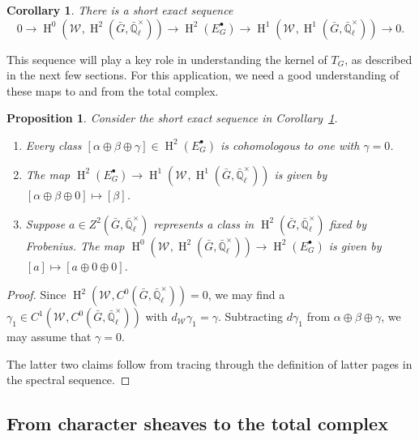 \documentclass[10pt]{amsart}
\theoremstyle{plain}
\newtheorem{proposition}[theorem]{Proposition}
\newtheorem{corollary}[theorem]{Corollary}
\theoremstyle{definition}
\newcommand{\EE}{\mathbb{\bar Q}_\ell}
\newcommand{\EEx}{\EE^\times}
\newcommand{\Weil}[1]{\mathcal{W}_{#1}}
\DeclareMathOperator{\Hh}{H}
\newcommand{\TrFrob}[1]{T_{#1}}
\newcommand{\bG}{\bar{G}}
\begin{document}
\begin{corollary}\label{cor:spectral_ses}
There is a short exact sequence
 \[
    0 \to
    \Hh^0(\Weil{},\Hh^2(\bG,\EEx)) \to
    \Hh^2(E^\bullet_G) \to
    \Hh^1(\Weil{},\Hh^1(\bG,\EEx)) \to
    0.
 \]
\end{corollary}

This sequence will play a key role in understanding the kernel of $\TrFrob{G}$, as described in the next few sections.
For this application, we need a good understanding of these maps to and from the total complex.

\begin{proposition} \label{prop:ses_desc}
Consider the short exact sequence in Corollary~\ref{cor:spectral_ses}.
\begin{enumerate}
\item Every class $[\alpha\oplus\beta\oplus\gamma] \in \Hh^2(E^\bullet_G)$ is cohomologous to one with $\gamma=0$.
\item The map $\Hh^2(E^\bullet_G) \to \Hh^1(\Weil{},\Hh^1(\bG,\EEx))$ is given by $[\alpha\oplus\beta\oplus 0] \mapsto [\beta]$.
\item Suppose $a \in Z^2(\bG, \EEx)$ represents a class in $\Hh^2(\bG,\EEx)$ fixed by Frobenius.
The map $\Hh^0(\Weil{},\Hh^2(\bG,\EEx)) \to \Hh^2(E^\bullet_G)$ is given by $[a] \mapsto [a \oplus 0 \oplus 0]$.
\end{enumerate}
\end{proposition}
\begin{proof}
Since $\Hh^2(\Weil{}, C^0(\bG, \EEx)) = 0$, we may find a $\gamma_1 \in C^1(\Weil{}, C^0(\bG, \EEx))$ with $d_{\Weil{}}\gamma_1 = \gamma$.
Subtracting $d \gamma_1$ from $\alpha\oplus\beta\oplus\gamma$, we may assume that $\gamma = 0$.

The latter two claims follow from tracing through the definition of latter pages in the spectral sequence.
\end{proof}

\subsection{From character sheaves to the total complex}\label{ssec:S}
\end{document}
